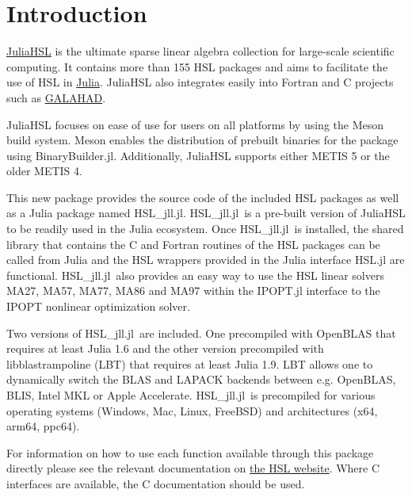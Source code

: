 \documentclass[gdweb]{geradwp}
\newcommand{\JuliaHSL}{JuliaHSL\xspace}  %
\newcommand{\HSLjll}{HSL\_jll.jl}
\begin{document}

\GDarticlestart

\section{Introduction}

\href{https://licences.stfc.ac.uk/product/julia-hsl}{\JuliaHSL} is the ultimate sparse linear algebra collection for large-scale scientific computing.
It contains more than 155 HSL packages and aims to facilitate the use of HSL in \href{https://julialang.org/}{Julia}.
\JuliaHSL also integrates easily into Fortran and C projects such as \href{https://github.com/ralna/GALAHAD}{GALAHAD}.

\JuliaHSL focuses on ease of use for users on all platforms by using the Meson build system.
Meson enables the distribution of prebuilt binaries for the package using BinaryBuilder.jl.
Additionally, \JuliaHSL supports either METIS 5 or the older METIS 4.

This new package provides the source code of the included HSL packages as well as a Julia package named \HSLjll.
\HSLjll~is a pre-built version of \JuliaHSL to be readily used in the Julia ecosystem.
Once \HSLjll~is installed, the shared library that contains the C and Fortran routines of the HSL packages can be called from Julia and the HSL wrappers provided in the Julia interface HSL.jl are functional.
\HSLjll~also provides an easy way to use the HSL linear solvers MA27, MA57, MA77, MA86 and MA97 within the IPOPT.jl interface to the IPOPT nonlinear optimization solver.

Two versions of \HSLjll~are included. One precompiled with OpenBLAS that requires at least Julia 1.6 and the other version precompiled with libblastrampoline (LBT) that requires at least Julia 1.9.
LBT allows one to dynamically switch the BLAS and LAPACK backends between e.g. OpenBLAS, BLIS, Intel MKL or Apple Accelerate.
\HSLjll~is precompiled for various operating systems (Windows, Mac, Linux, FreeBSD) and architectures (x64, arm64, ppc64).

For information on how to use each function available through this package directly please see the relevant documentation on \href{https://www.hsl.rl.ac.uk/catalogue/}{the HSL website}.
Where C interfaces are available, the C documentation should be used.
\end{document}
